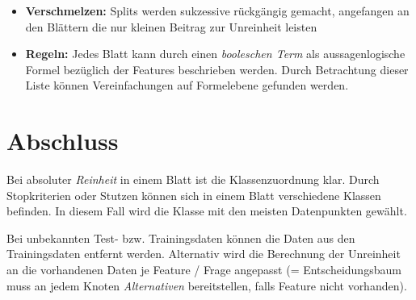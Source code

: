 \documentclass{report}
\begin{document}
  \begin{itemize}	
    \item \textbf{Verschmelzen:} Splits werden sukzessive rückgängig gemacht, angefangen an den Blättern die nur kleinen	
    Beitrag zur Unreinheit leisten	
    \item \textbf{Regeln:} Jedes Blatt kann durch einen \textit{booleschen Term} als aussagenlogische Formel bezüglich der	
    Features beschrieben werden. Durch Betrachtung dieser Liste können Vereinfachungen auf Formelebene gefunden werden.	
  \end{itemize}	
  
  \section{Abschluss}	
  
  Bei absoluter \textit{Reinheit} in einem Blatt ist die Klassenzuordnung klar. Durch Stopkriterien oder Stutzen können sich in einem	
  Blatt verschiedene Klassen befinden. In diesem Fall wird die Klasse mit den meisten Datenpunkten gewählt.\par	
  
  Bei unbekannten Test- bzw. Trainingsdaten können die Daten aus den Trainingsdaten entfernt werden. Alternativ wird die	
  Berechnung der Unreinheit an die vorhandenen Daten je Feature / Frage angepasst (= Entscheidungsbaum muss an jedem Knoten	
  \textit{Alternativen} bereitstellen, falls Feature nicht vorhanden).	
  
  
\end{document}
